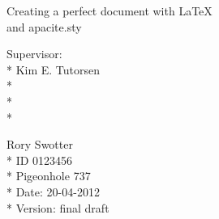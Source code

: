 
\begin{titlepage}
\begin{center}
  {
    \vspace*{5mm}    %
    \Large                    %
    \bfseries                 %
    
    Creating a perfect document with \LaTeX\\ and apacite.sty
  }
\end{center}
\vfill

\begin{multicols}{2}
  \normalsize
  \noindent
    Supervisor:\\*
    Kim E. Tutorsen\\*
    \\*
    \\*
    
    \noindent
    Rory Swotter\\*
    ID 0123456\\*
    Pigeonhole 737\\*
    Date: 20-04-2012\\*
    Version: final draft
    
  \end{multicols}
\end{titlepage}
